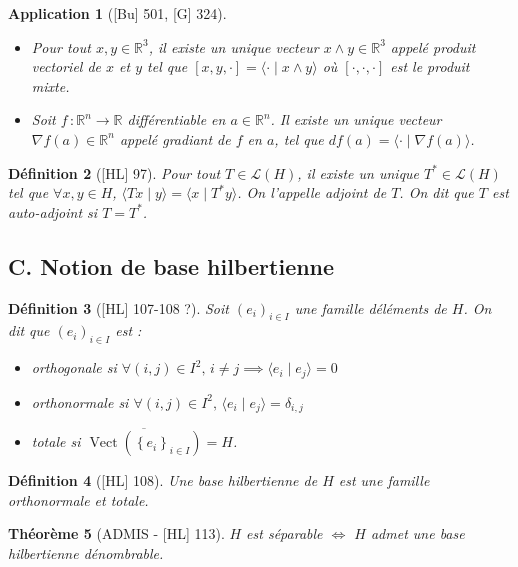 \documentclass[10pt, a4paper, parskip=full, twoside, twocolumn]{report}
\newtheorem{definition}{Définition}
\newtheorem{theorem}[definition]{Théorème}
\newtheorem{application}[definition]{Application}
\newcommand{\IR}{\mathbb{R}}
\newcommand{\ps}[2]{\langle #1\mid #2\rangle}
\DeclareMathOperator{\Vect}{Vect}
\begin{document}
\begin{application}[\textnormal{[Bu] 501, [G] 324}]
	\begin{itemize}
		\item Pour tout $x,y\in \IR^3$, il existe un unique vecteur $x\wedge y\in \IR^3$ appelé \emph{produit vectoriel de $x$ et $y$} tel que $[x,y,\cdot] = \ps{\cdot}{x\wedge y}$ où $[\cdot,\cdot,\cdot]$ est le produit mixte.
		\item Soit $f\,\colon \IR^n\to \IR$ différentiable en $a\in\IR^n$. Il existe un unique vecteur $\nabla f(a)\in\IR^n$ appelé \emph{gradiant de $f$ en $a$}, tel que $df(a) = \ps{\cdot}{\nabla f(a)}$. 
	\end{itemize}
\end{application}

\begin{definition}[\textnormal{[HL] 97}]
	Pour tout $T\in\mathcal{L}(H)$, il existe un unique $T^*\in\mathcal{L}(H)$ tel que $\forall x,y\in H$, $\ps{Tx}{y}=\ps{x}{T^*y}$. On l'appelle \emph{adjoint de $T$}.
	On dit que $T$ est \emph{auto-adjoint} si $T = T^*$.
\end{definition}

\subsection*{C. Notion de base hilbertienne}

\begin{definition}[\textnormal{[HL] 107-108 ?}]
	Soit $(e_i)_{i\in I}$ une famille déléments de $H$. On dit que $(e_i)_{i\in I}$ est :
	\begin{itemize}
		\item \emph{orthogonale} si $\forall (i,j)\in I^2,\, i\neq j\implies \ps{e_i}{e_j} = 0$
		\item \emph{orthonormale} si $\forall (i,j)\in I^2,\, \ps{e_i}{e_j} = \delta_{i,j}$
		\item \emph{totale} si $\overline{\Vect(\left\{e_i\right\}_{i\in I})} = H$.
	\end{itemize}
\end{definition}

\begin{definition}[\textnormal{[HL] 108}]
	Une \emph{base hilbertienne} de $H$ est une famille orthonormale et totale.
\end{definition}

\begin{theorem}[ADMIS - \textnormal{[HL] 113}]
	$H$ est séparable $\iff$ $H$ admet une base hilbertienne dénombrable.
\end{theorem}
\end{document}
